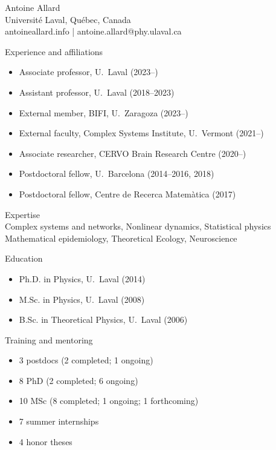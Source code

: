 \documentclass[10pt]{article}
\begin{document}
%
\thispagestyle{empty}
%
\color{font}
%
\begin{center}
  {\LARGE Antoine Allard}\vspace{0.25\baselineskip}\\
  {\color{mongris}Université Laval, Québec, Canada}\\
  {\color{mongris}antoineallard.info | antoine.allard@phy.ulaval.ca}
\end{center}
\vspace*{0.5\baselineskip}
\begin{minipage}[t]{0.56\textwidth}
  {\large\color{monbleu}Experience and affiliations}
  \begin{itemize}
    \item Associate professor, U.~Laval (2023--\quad)
    \item Assistant professor, U.~Laval (2018--2023)
    \item External member, BIFI, U.~Zaragoza (2023--\quad)
    \item External faculty, Complex Systems Institute, U.~Vermont (2021--\quad)
    \item Associate researcher, CERVO Brain Research Centre (2020--\quad)
    \item Postdoctoral fellow, U.~Barcelona (2014--2016, 2018)
    \item Postdoctoral fellow, Centre de Recerca Matemàtica (2017)
  \end{itemize}
  \vspace*{0.5\baselineskip}
  {\large\color{monbleu}Expertise}\\
  Complex systems and networks, Nonlinear dynamics, Statistical physics\\
  Mathematical epidemiology, Theoretical Ecology, Neuroscience
\end{minipage}
\hfill
\begin{minipage}[t]{0.42\textwidth}
  {\large\color{monbleu}Education}
  \begin{itemize}
    \item Ph.D. in Physics, U.~Laval (2014)
    \item M.Sc. in Physics, U.~Laval (2008)
    \item B.Sc. in Theoretical Physics, U.~Laval (2006)
  \end{itemize}
  \vspace*{1.5\baselineskip}
  {\large\color{monbleu}Training and mentoring}
  \begin{itemize}
    \item 3 postdocs (2 completed; 1 ongoing)
    \item 8 PhD (2 completed; 6 ongoing)
    \item 10 MSc (8 completed; 1 ongoing; 1 forthcoming)
    \item 7 summer internships
    \item 4 honor theses
  \end{itemize}
\end{minipage}
\end{document}
